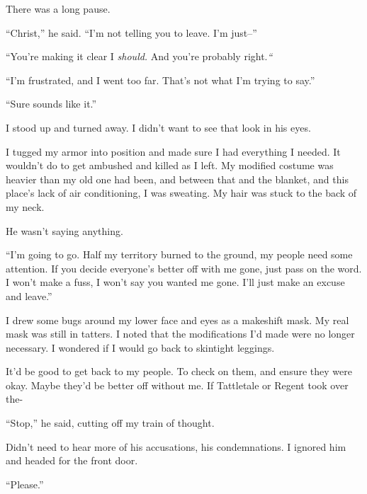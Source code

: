 There was a long pause.



``Christ,'' he said.  ``I'm not telling you to leave.  I'm just--''



``You're making it clear I \emph{should}\emph{.  }And you're probably right.\emph{``}



``I'm frustrated, and I went too far.  That's not what I'm trying to say.''



``Sure sounds like it.''



I stood up and turned away.  I didn't want to see that look in his eyes.



I tugged my armor into position and made sure I had everything I needed.  It wouldn't do to get ambushed and killed as I left.  My modified costume was heavier than my old one had been, and between that and the blanket, and this place's lack of air conditioning, I was sweating.  My hair was stuck to the back of my neck.



He wasn't saying anything.



``I'm going to go.  Half my territory burned to the ground, my people need some attention.  If you decide everyone's better off with me gone, just pass on the word.  I won't make a fuss, I won't say you wanted me gone.  I'll just make an excuse and leave.''



I drew some bugs around my lower face and eyes as a makeshift mask.  My real mask was still in tatters.  I noted that the modifications I'd made were no longer necessary.  I wondered if I would go back to skintight leggings.



It'd be good to get back to my people.  To check on them, and ensure they were okay.  Maybe they'd be better off without me.  If Tattletale or Regent took over the-



``Stop,'' he said, cutting off my train of thought.



Didn't need to hear more of his accusations, his condemnations.  I ignored him and headed for the front door.



``Please.''



